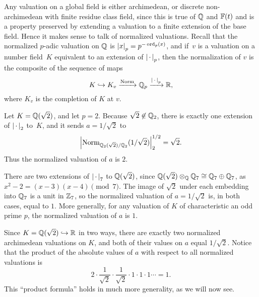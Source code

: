Any valuation on a global field is either archimedean, or discrete
non-archimedean with finite residue class field, since this is true of
$\mathbb{Q}$ and $\mathbb{F}(t)$ and is a property preserved by extending a valuation
to a finite extension of the base field.  Hence it makes sense to talk
of normalized valuations.  Recall that the normalized $p$-adic
valuation on $\mathbb{Q}$ is $\left|x\right|_p = p^{-\operatorname{ord}_p(x)}$, and if~$v$ is a
valuation on a number field~$K$ equivalent to an extension of
$\left|\,\cdot\,\right|_p$, then the normalization of $v$ is the composite of the
sequence of maps
$$
  K\hookrightarrow K_v \xrightarrow{\operatorname{Norm}} \mathbb{Q}_p \xrightarrow{\left|\,\cdot\,\right|_p} \mathbb{R},
$$
where $K_v$ is the completion of $K$ at $v$.

\begin{example}
Let $K=\mathbb{Q}(\sqrt{2})$, and let $p=2$.  Because $\sqrt{2}\not\in\mathbb{Q}_2$, there is
exactly one extension of $\left|\,\cdot\,\right|_2$ to~$K$, and
it sends $a=1/\sqrt{2}$ to
$$
  \left|\operatorname{Norm}_{\mathbb{Q}_2(\sqrt{2})/\mathbb{Q}_2}(1/\sqrt{2})\right|^{1/2}_2 = \sqrt{2}.
$$
Thus the normalized valuation of $a$ is $2$.

There are two extensions of $\left|\,\cdot\,\right|_7$ to $\mathbb{Q}(\sqrt{2})$,
since $\mathbb{Q}(\sqrt{2})\otimes_{\mathbb{Q}} \mathbb{Q}_7 \cong \mathbb{Q}_7 \oplus \mathbb{Q}_7$,
as $x^2-2 = (x-3)(x-4)\pmod{7}$.  The image of $\sqrt{2}$
under each embedding into $\mathbb{Q}_7$ is a unit in $\mathbb{Z}_7$, so
the normalized valuation of $a=1/\sqrt{2}$ is, in both
cases, equal to $1$.  More generally, for any valuation
of $K$ of characteristic an odd prime $p$, the
normalized valuation of $a$ is $1$.

Since $K=\mathbb{Q}(\sqrt{2})\hookrightarrow \mathbb{R}$ in two ways, there are exactly
two normalized archimedean valuations on $K$, and
both of their values on $a$ equal $1/\sqrt{2}$.
Notice that the product of the absolute values of $a$
with respect to all normalized valuations is
$$
   2 \cdot \frac{1}{\sqrt{2}} \cdot \frac{1}{\sqrt{2}} \cdot 1
   \cdot 1 \cdot 1 \cdots  = 1.
$$
This ``product formula'' holds in much more generality, as
we will now see.
\end{example}


